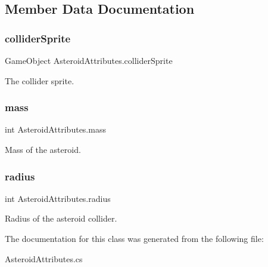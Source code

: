 \subsection{Member Data Documentation}
\mbox{\label{class_asteroid_attributes_a25d09f5bc06ec1aa4761fe4ec30eebca}} 
\subsubsection{\texorpdfstring{collider\+Sprite}{colliderSprite}}
{\footnotesize\ttfamily Game\+Object Asteroid\+Attributes.\+collider\+Sprite}



The collider sprite. 

\mbox{\label{class_asteroid_attributes_a671f2c91e2ad27a1f1d45346ec8dcd22}} 
\subsubsection{\texorpdfstring{mass}{mass}}
{\footnotesize\ttfamily int Asteroid\+Attributes.\+mass}



Mass of the asteroid. 

\mbox{\label{class_asteroid_attributes_a8cc9267ef0f5534260f7ccb7c16c04ca}} 
\subsubsection{\texorpdfstring{radius}{radius}}
{\footnotesize\ttfamily int Asteroid\+Attributes.\+radius}



Radius of the asteroid collider. 



The documentation for this class was generated from the following file\+:\begin{DoxyCompactItemize}
\item 
Asteroid\+Attributes.\+cs\end{DoxyCompactItemize}
